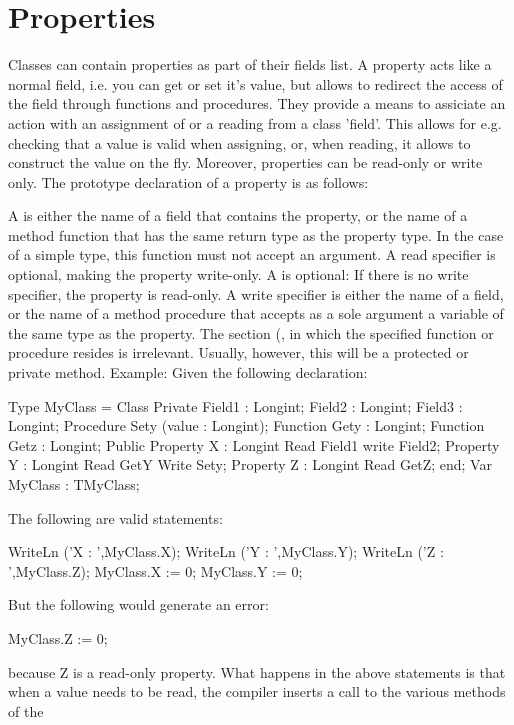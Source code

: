 \documentclass{report}
\begin{document}
\section{Properties}
Classes can contain properties as part of their fields list. A property
acts like a normal field, i.e. you can get or set it's value, but 
allows to redirect the access of the field through functions and 
procedures. They provide a means to assiciate an action with an assignment
of or a reading from a class 'field'. This allows for e.g. checking that a
value is valid when assigning, or, when reading, it allows to construct the
value on the fly. Moreover, properties can be read-only or write only.
The prototype declaration of a property is as follows:

A  is either the name of a field that contains the
property, or the name of a method function that has the same return type as 
the property type. In the case of a simple type, this
function must not accept an argument. A read specifier is optional, making
the property write-only.
A  is optional: If there is no write specifier, the
property is read-only. A write specifier is either the name of a field, or
the name of a method procedure that accepts as a sole argument a variable of
the same type as the property.
The section (,  in which the specified function or 
procedure resides is irrelevant. Usually, however, this will be a protected
or private method.
Example:
Given the following declaration:
\begin{listing}
Type
  MyClass = Class
    Private
    Field1 : Longint;
    Field2 : Longint;
    Field3 : Longint;
    Procedure  Sety (value : Longint);
    Function Gety : Longint; 
    Function Getz : Longint;
    Public
    Property X : Longint Read Field1 write Field2;
    Property Y : Longint Read GetY Write Sety;
    Property Z : Longint Read GetZ;
    end;
Var MyClass : TMyClass; 
\end{listing}
The following are valid statements:
\begin{listing}
WriteLn ('X : ',MyClass.X);
WriteLn ('Y : ',MyClass.Y);
WriteLn ('Z : ',MyClass.Z);
MyClass.X := 0;
MyClass.Y := 0;
\end{listing}
But the following would generate an error:
\begin{listing}
MyClass.Z := 0;
\end{listing}
because Z is a read-only property.
What happens in the above statements is that when a value needs to be read,
the compiler inserts a call to the various  methods of the
\end{document}
